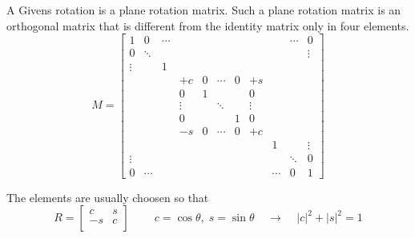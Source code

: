 A Givens rotation is a plane rotation matrix.  Such a plane rotation
matrix is an orthogonal matrix that is different from the identity
matrix only in four elements.
\begin{equation}
\label{eq:rotation}
M =
\left[
\begin{array}{ccccccccccc}
1 & 0 & \cdots &  &  &  &  &  &  & \cdots & 0\\
0 & \ddots &  &  &  &  &  &  &  &  & \vdots\\
\vdots &  & 1 &  &  &  &  &  &  &  & \\
 &  &  & +c & 0 & \cdots & 0 & +s &  &  & \\
 &  &  & 0 & 1 &  &  & 0 &  &  & \\
 &  &  & \vdots &  & \ddots &  & \vdots &  &  & \\
 &  &  & 0 &  &  & 1 & 0 &  &  & \\
 &  &  & -s & 0 & \cdots & 0 & +c &  &  & \\
 &  &  &  &  &  &  &  & 1 &  & \vdots\\
\vdots &  &  &  &  &  &  &  &  & \ddots & 0\\
0 & \cdots &  &  &  &  &  &  & \cdots & 0 & 1
\end{array}
\right]
\end{equation}

The elements are usually choosen so that
\begin{equation}
\label{eq:givenscond}
R =
\left[\begin{array}{rl}
c & s\\
-s & c\\
\end{array}\right]
\;\;\;\;  \;\;\;\;
c = \cos{\theta},\; s = \sin{\theta}
\;\;\;\; \rightarrow \;\;\;\;
\left|c\right|^2 + \left|s\right|^2 = 1
\end{equation}

